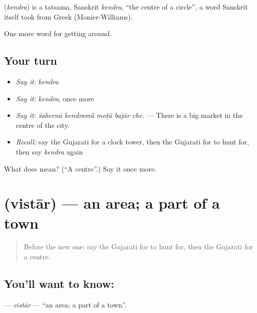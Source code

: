 \begin{cousinweb}
\textbf{} (\emph{kendra}) is a tatsama, Sanskrit \emph{kendra}, \textquotedblleft{}the centre of a circle\textquotedblright{}, a word Sanskrit itself took from Greek (Monier-Williams).
\end{cousinweb}

\begin{grammarlens}[title={What you've built}]
One more word for getting around.
\end{grammarlens}

\subsection*{Your turn}
\begin{itemize}
\raggedright
  \item \emph{Say it:} \emph{kendra}
  \item \emph{Say it:} \emph{kendra}, once more
  \item \emph{Say it:} \emph{śahernā kendramā̃ moṭũ bajār che.} — There is a big market in the centre of the city.
  \item \emph{Recall:} say the Gujarati for a clock tower, then the Gujarati for to hunt for, then say \emph{kendra} again
\end{itemize}

\begin{tcolorbox}[breakable,colback=teal!4,colframe=teal!35!black,title={Before you move on}]
What does  mean? (\textquotedblleft{}A centre\textquotedblright{}.) Say it once more.
\end{tcolorbox}
\section[\texorpdfstring{\gu{વિસ્તાર} (vistār)}{વિસ્તાર (vistār)}]{ (vistār) — an area; a part of a town}

\label{lesson:GU-C416-vistar}



\begin{quote}
Before the new one: say the Gujarati for to hunt for, then the Gujarati for a centre.
\end{quote}

\subsection*{You'll want to know: }
\textbf{} — \emph{vistār} — \textquotedblleft{}an area; a part of a town\textquotedblright{}.

